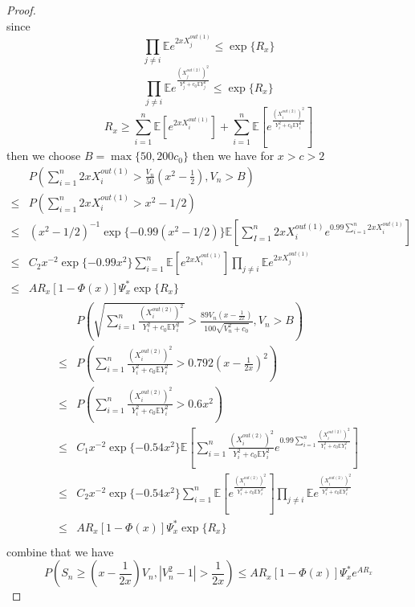 \documentclass[bj,authoryear]{imsart}
\numberwithin{equation}{section}
\theoremstyle{plain}
\theoremstyle{definition}
\begin{document}
\begin{proof}
\begin{equation}
  \end{equation}
  since $$\prod_{j\neq i}\mathbb{E} e^{2xX_{j}^{out(1)}}\leq \exp\{R_x\}$$
  $$\prod_{j\neq i}\mathbb{E} e^{\frac{(X_{j}^{out(2)})^2}{Y_j^2+c_0\mathbb{E} Y_{j}^{2}}}\leq \exp\{R_x\}$$
  $$R_x\geq \sum_{i=1}^{n}\mathbb{E} [e^{2xX_{i}^{out(1)}}]+\sum_{i=1}^{n}\mathbb{E} [e^{\frac{(X_{i}^{out(2)})^2}{Y_i^2+c_0\mathbb{E} Y_i^2}}]$$
  then we choose $B = \max\{50,200c_0\}$ then we have for $x>c>2$
  \begin{equation}
    \begin{aligned}
      &P(\sum_{i=1}^{n}2xX_{i}^{out(1)}>\frac{V_n}{50}(x^2-\frac{1}{2}),V_n>B)\\
      \leq &P(\sum_{i=1}^{n}2xX_{i}^{out(1)}>x^2-1/2)\\
      \leq &(x^2-1/2)^{-1}\exp\{-0.99(x^2-1/2)\}\mathbb{E} [\sum_{I=1}^{n}2xX_{i}^{out(1)}e^{0.99\sum_{i=1}^{n}2xX_{i}^{out(1)}}]\\
      \leq &C_2x^{-2}\exp\{-0.99x^2\}\sum_{i=1}^{n}\mathbb{E} [e^{2xX_{i}^{out(1)}}]\prod_{j\neq i}\mathbb{E} e^{2xX_{j}^{out(1)}}\\
      \leq &AR_x[1-\Phi(x)]\Psi_{x}^{*}\exp\{R_x\}
    \end{aligned}
  \end{equation}
  \begin{eqnarray}
    \begin{aligned}
      &P(\sqrt{\sum_{i=1}^{n}\frac{(X_{i}^{out(2)})^{2}}{Y_i^2+c_0\mathbb{E} Y_i^2}}>\frac{89V_n(x-\frac{1}{2x})}{100\sqrt{V_n^2+c_0}},V_n>B)\\
      \leq &P(\sum_{i=1}^{n}\frac{(X_{i}^{out(2)})^{2}}{Y_i^2+c_0\mathbb{E} Y_i^2}>0.792(x-\frac{1}{2x})^2)\\
      \leq &P(\sum_{i=1}^{n}\frac{(X_{i}^{out(2)})^{2}}{Y_i^2+c_0\mathbb{E} Y_i^2}>0.6x^2)\\
      \leq & C_1x^{-2}\exp\{-0.54x^2\}\mathbb{E} [\sum_{i=1}^{n}\frac{(X_{i}^{out(2)})^{2}}{Y_i^2+c_0\mathbb{E} Y_i^2}e^{0.99\sum_{i=1}^{n}\frac{(X_{i}^{out(2)})^{2}}{Y_i^2+c_0\mathbb{E} Y_i^2}}]\\
      \leq & C_2x^{-2}\exp\{-0.54x^2\}\sum_{i=1}^{n}\mathbb{E} [e^{\frac{(X_{i}^{out(2)})^{2}}{Y_i^2+c_0\mathbb{E} Y_i^2}}]\prod_{j\neq i}\mathbb{E} e^{\frac{(X_{i}^{out(2)})^{2}}{Y_i^2+c_0\mathbb{E} Y_i^2}}\\
      \leq & AR_x[1-\Phi(x)]\Psi_{x}^{*}\exp\{R_x\}\\
    \end{aligned}
  \end{eqnarray}
  combine that we have
  \begin{equation}
    P(S_n\geq(x-\frac{1}{2x})V_n,|V_n^2-1|>\frac{1}{2x})\leq AR_x[1-\Phi(x)]\Psi_{x}^{*}e^{AR_x}
  \end{equation}
\end{proof}
\end{document}
